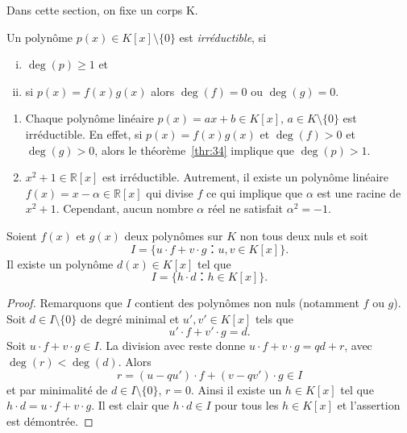 Dans cette section, on fixe un corps K.

\begin{definition}
  \label{def:53}
  Un polynôme $p(x) ∈ K[x] \setminus \{0\}$ est \emph{irréductible}, si
  \begin{enumerate}[i)]
  \item $\deg(p) ≥1$ et
  \item  si $p(x) = f(x) g(x)$ alors $\deg(f) = 0$ ou $\deg(g) = 0$. 
  \end{enumerate}
\end{definition}

\begin{example}
  \label{exe:46}
  \begin{enumerate}
  \item   Chaque polynôme linéaire $p(x) = ax + b ∈ K[x]$, $a ∈ K \setminus\{0\}$ est irréductible. En effet, si $p(x) = f(x) g(x)$ et $\deg(f)>0$ et $\deg(g)>0$, alors le théorème~\ref{thr:34} implique que $\deg(p) >1$.
  \item $x^2 +1 ∈ℝ[x]$ est irréductible. Autrement, il existe un polynôme linéaire $f(x) =  x - α ∈ ℝ[x]$ qui divise $f$ ce qui implique que $α$ est une racine de $x^2 +1$. Cependant, aucun nombre $α$ réel ne satisfait $α^2 = -1$.
  \end{enumerate}
\end{example}

\begin{theorem}
  \label{thr:54}
  Soient $f(x)$ et $g(x)$ deux polynômes sur $K$ non tous deux nuls et soit 
  \begin{displaymath}
    I = \{ u ⋅ f + v ⋅ g ： u,v ∈ K[x]\}.
  \end{displaymath}
  Il existe un  polynôme $d(x)∈K[x]$ tel que
  \begin{equation}
    \label{eq:51}
    I = \{ h ⋅ d ： h ∈ K[x]\}. 
  \end{equation}
\end{theorem}

\begin{proof}
  Remarquons que $I$ contient des polynômes non nuls (notamment $f$ ou $g$). Soit $d ∈ I \setminus \{0\}$ de degré minimal et $u',v' ∈ K[x]$ tels que
  \begin{displaymath}
    u' ⋅ f + v' ⋅g = d. 
  \end{displaymath}
  Soit $u⋅f + v⋅ g ∈ I$. La division avec reste donne $u⋅f + v⋅ g = qd +r$, avec $\deg(r) < \deg(d)$. Alors
  \begin{displaymath}
    r = (u - qu') ⋅ f + (v - qv') ⋅ g ∈ I
  \end{displaymath}
  et par minimalité de $d ∈ I \setminus\{0\}$, $r=0$. Ainsi il existe un $h∈K[x]$ tel que $h⋅d =  u⋅f + v⋅ g$. Il est clair que $h⋅d ∈I$ pour tous les $h ∈K[x]$ et l'assertion est démontrée.   
\end{proof}


